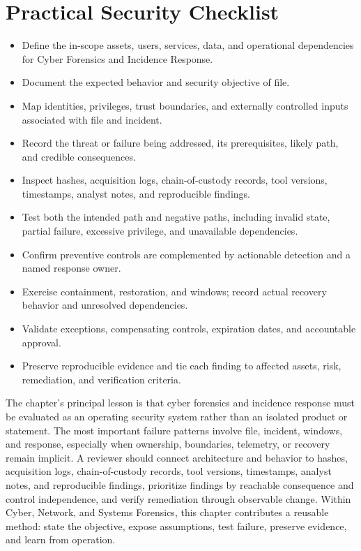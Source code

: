 \documentclass[11pt]{article}
\begin{document}
\section*{Practical Security Checklist}
\begin{itemize}[label=$\square$]
\item Define the in-scope assets, users, services, data, and operational dependencies for Cyber Forensics and Incidence Response.
\item Document the expected behavior and security objective of file.
\item Map identities, privileges, trust boundaries, and externally controlled inputs associated with file and incident.
\item Record the threat or failure being addressed, its prerequisites, likely path, and credible consequences.
\item Inspect hashes, acquisition logs, chain-of-custody records, tool versions, timestamps, analyst notes, and reproducible findings.
\item Test both the intended path and negative paths, including invalid state, partial failure, excessive privilege, and unavailable dependencies.
\item Confirm preventive controls are complemented by actionable detection and a named response owner.
\item Exercise containment, restoration, and windows; record actual recovery behavior and unresolved dependencies.
\item Validate exceptions, compensating controls, expiration dates, and accountable approval.
\item Preserve reproducible evidence and tie each finding to affected assets, risk, remediation, and verification criteria.
\end{itemize}
\begin{synthesisbox}
The chapter's principal lesson is that cyber forensics and incidence response must be evaluated as an operating security system rather than an isolated product or statement. The most important failure patterns involve file, incident, windows, and response, especially when ownership, boundaries, telemetry, or recovery remain implicit. A reviewer should connect architecture and behavior to hashes, acquisition logs, chain-of-custody records, tool versions, timestamps, analyst notes, and reproducible findings, prioritize findings by reachable consequence and control independence, and verify remediation through observable change. Within Cyber, Network, and Systems Forensics, this chapter contributes a reusable method: state the objective, expose assumptions, test failure, preserve evidence, and learn from operation.
\end{synthesisbox}
\end{document}
